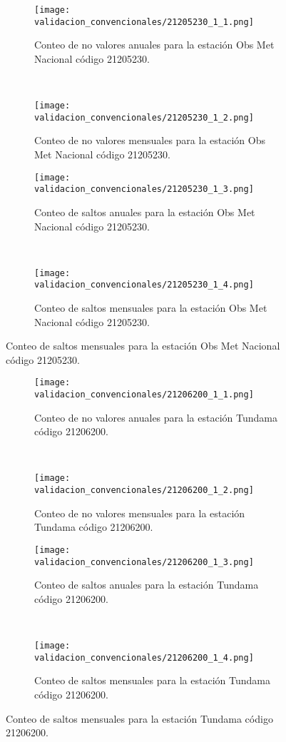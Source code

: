 \begin{figure}[H]\ContinuedFloat
\centering
	\begin{subfigure}[normla]{0.4\textwidth}
	\texttt{[image: validacion\_convencionales/21205230\_1\_1.png]}
		\caption{Conteo de no valores anuales para la estación Obs Met Nacional código 21205230.}
		\label{subfig:a1}
		\end{subfigure}
		~
    \begin{subfigure}[normla]{0.4\textwidth}
	\texttt{[image: validacion\_convencionales/21205230\_1\_2.png]}
		\caption{Conteo de no valores mensuales para la estación Obs Met Nacional código 21205230.}
		\label{subfig:a2}
		\end{subfigure}
		
    \begin{subfigure}[normla]{0.4\textwidth}
	\texttt{[image: validacion\_convencionales/21205230\_1\_3.png]}
		\caption{Conteo de saltos anuales para la estación Obs Met Nacional código 21205230.}
		\label{subfig:a1}
		\end{subfigure}
		~
    \begin{subfigure}[normla]{0.4\textwidth}
	\texttt{[image: validacion\_convencionales/21205230\_1\_4.png]}
		\caption{Conteo de saltos mensuales para la estación Obs Met Nacional código 21205230.}
		\label{subfig:a2}
		\end{subfigure}

	
\end{figure}
           
\begin{figure}[H]\ContinuedFloat
\centering
	\begin{subfigure}[normla]{0.4\textwidth}
	\texttt{[image: validacion\_convencionales/21206200\_1\_1.png]}
		\caption{Conteo de no valores anuales para la estación Tundama código 21206200.}
		\label{subfig:a1}
		\end{subfigure}
		~
    \begin{subfigure}[normla]{0.4\textwidth}
	\texttt{[image: validacion\_convencionales/21206200\_1\_2.png]}
		\caption{Conteo de no valores mensuales para la estación Tundama código 21206200.}
		\label{subfig:a2}
		\end{subfigure}
		
    \begin{subfigure}[normla]{0.4\textwidth}
	\texttt{[image: validacion\_convencionales/21206200\_1\_3.png]}
		\caption{Conteo de saltos anuales para la estación Tundama código 21206200.}
		\label{subfig:a1}
		\end{subfigure}
		~
    \begin{subfigure}[normla]{0.4\textwidth}
	\texttt{[image: validacion\_convencionales/21206200\_1\_4.png]}
		\caption{Conteo de saltos mensuales para la estación Tundama código 21206200.}
		\label{subfig:a2}
		\end{subfigure}

	
\end{figure}
           
